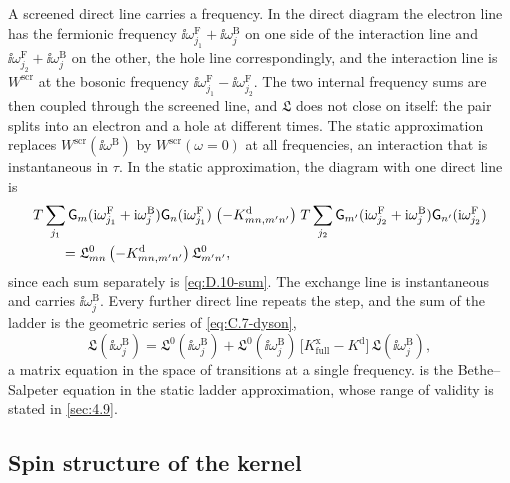 A screened direct line carries a frequency. In the direct diagram the electron line has the fermionic frequency $\ii\omega^{\mathrm{F}}_{j_1} + \ii\omega^{\mathrm{B}}_j$ on one side of the interaction line and $\ii\omega^{\mathrm{F}}_{j_2} + \ii\omega^{\mathrm{B}}_j$ on the other, the hole line correspondingly, and the interaction line is $W^{\mathrm{scr}}$ at the bosonic frequency $\ii\omega^{\mathrm{F}}_{j_1} - \ii\omega^{\mathrm{F}}_{j_2}$. The two internal frequency sums are then coupled through the screened line, and $\mathfrak{L}$ does not close on itself: the pair splits into an electron and a hole at different times. The static approximation replaces $W^{\mathrm{scr}}(\ii\omega^{\mathrm{B}})$ by $W^{\mathrm{scr}}(\omega = 0)$ at all frequencies, an interaction that is instantaneous in $\tau$. In the static approximation, the diagram with one direct line is
\begin{equation*}
  \begin{aligned}
  &T\sum_{j_1}\mathsf{G}_m(\mathrm{i}\omega^{\mathrm{F}}_{j_1} + \mathrm{i}\omega^{\mathrm{B}}_j)\mathsf{G}_n(\mathrm{i}\omega^{\mathrm{F}}_{j_1})\;\bigl(-K^{\mathrm{d}}_{mn,m'n'}\bigr)\;T\sum_{j_2}\mathsf{G}_{m'}(\mathrm{i}\omega^{\mathrm{F}}_{j_2} + \mathrm{i}\omega^{\mathrm{B}}_j)\mathsf{G}_{n'}(\mathrm{i}\omega^{\mathrm{F}}_{j_2}) \\
  &\qquad = \mathfrak{L}^0_{mn}\,\bigl(-K^{\mathrm{d}}_{mn,m'n'}\bigr)\,\mathfrak{L}^0_{m'n'} ,
  \end{aligned}
\end{equation*}
since each sum separately is \cref{eq:D.10-sum}. The exchange line is instantaneous and carries $\ii\omega^{\mathrm{B}}_j$. Every further direct line repeats the step, and the sum of the ladder is the geometric series of \cref{eq:C.7-dyson},
\begin{equation}
  \mathfrak{L}(\ii\omega^{\mathrm{B}}_j) = \mathfrak{L}^0(\ii\omega^{\mathrm{B}}_j) + \mathfrak{L}^0(\ii\omega^{\mathrm{B}}_j)\,\bigl[K^{\mathrm{x}}_{\mathrm{full}} - K^{\mathrm{d}}\bigr]\,\mathfrak{L}(\ii\omega^{\mathrm{B}}_j) ,
  \label{eq:D.12-BSE}
\end{equation}
a matrix equation in the space of transitions at a single frequency.  is the Bethe--Salpeter equation in the static ladder approximation, whose range of validity is stated in \cref{sec:4.9}.

\subsection*{Spin structure of the kernel}

